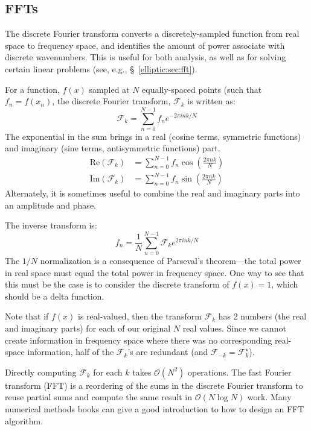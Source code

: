 \subsection{FFTs}

The discrete Fourier transform converts a discretely-sampled function
from real space to frequency space, and identifies the amount of power
associate with discrete wavenumbers.  This is useful for both
analysis, as well as for solving certain linear problems (see, e.g.,
\S~\ref{elliptic:sec:fft}).

For a function, $f(x)$ sampled at $N$ equally-spaced points (such that
$f_n = f(x_n)$, the discrete Fourier transform, $\mathcal{F}_k$ is
written as:
\begin{equation}
\mathcal{F}_k = \sum_{n=0}^{N-1} f_n e^{-2\pi i n k /N}
\end{equation}
The exponential in the sum brings in a real (cosine terms, symmetric
functions) and imaginary (sine terms, antisymmetric functions) part.
\begin{align}
\mathrm{Re}(\mathcal{F}_k) &= \sum_{n=0}^{N-1} f_n \cos\left(\frac{2\pi n k}{N}\right) \\
\mathrm{Im}(\mathcal{F}_k) &= \sum_{n=0}^{N-1} f_n \sin\left(\frac{2\pi n k}{N}\right)
\end{align}
Alternately, it is sometimes useful to combine the real and imaginary
parts into an amplitude and phase.

The inverse transform is:
\begin{equation}
f_n = \frac{1}{N} \sum_{n=0}^{N-1} \mathcal{F}_k e^{2\pi i n k /N}
\end{equation}
The $1/N$ normalization is a consequence of Parseval's theorem---the
total power in real space must equal the total power in frequency
space.  One way to see that this must be the case is to consider the
discrete transform of $f(x) = 1$, which should be a delta function.

Note that if $f(x)$ is real-valued, then the transform $\mathcal{F}_k$
has 2 numbers (the real and imaginary parts) for each of our original
$N$ real values.  Since we cannot create information in frequency
space where there was no corresponding real-space information, half of
the $\mathcal{F}_k$'s are redundant (and $\mathcal{F}_{-k} =
\mathcal{F}^\star_k$).

Directly computing $\mathcal{F}_k$ for each $k$ takes $\mathcal{O}(N^2)$
operations.  The fast Fourier transform (FFT) is a reordering of the
sums in the discrete Fourier transform to reuse partial sums and compute
the same result in $\mathcal{O}(N\log N)$ work.  Many numerical methods
books can give a good introduction to how to design an FFT algorithm.

